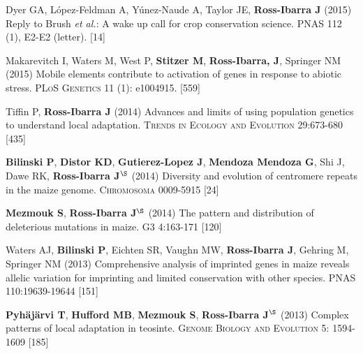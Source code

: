 \documentclass[letterpaper,10pt]{article}
\begin{document}
\begin{etaremune}
\item Dyer GA, L\'opez-Feldman A, Y\'unez-Naude A, Taylor JE, {\bf Ross-Ibarra J} (2015) Reply to Brush \emph{et al.}: A wake up call for crop conservation science. PNAS 112 (1), E2-E2 (letter).
{} [14]\\


\item Makarevitch I, Waters M, West P, {\bf Stitzer M}, {\bf Ross-Ibarra, J}, Springer NM (2015) Mobile elements contribute to activation of genes in response to abiotic stress. \textsc{PLoS Genetics} 11 (1): e1004915. %
{} [559]\\


\item Tiffin P, {\bf Ross-Ibarra J} (2014) Advances and limits of using population genetics to understand local adaptation. \textsc{Trends in Ecology and Evolution} 29:673-680 %
{} [435]\\


\item {\bf Bilinski P}, {\bf Distor KD}, {\bf Gutierez-Lopez J}, {\bf Mendoza Mendoza G}, Shi J, Dawe RK,  {\bf Ross-Ibarra J}$^\S$ (2014) Diversity and evolution of centromere repeats in the maize genome. \textsc{Chromosoma} 0009-5915
{} [24]\\

\item {\bf Mezmouk S}, {\bf Ross-Ibarra J}$^\S$ (2014) The pattern and distribution of deleterious mutations in maize. \textsc{G3} 4:163-171
{} [120]\\

\item Waters AJ, {\bf Bilinski P}, Eichten SR, Vaughn MW, {\bf Ross-Ibarra J}, Gehring M, Springer NM (2013) Comprehensive analysis of imprinted genes in maize reveals allelic variation for imprinting and limited conservation with other species. \textsc{PNAS} 110:19639-19644
{} [151]\\


\item {\bf Pyh\"aj\"arvi T}, {\bf Hufford MB}, {\bf Mezmouk S}, {\bf Ross-Ibarra J}$^\S$ (2013) Complex patterns of local adaptation in teosinte. \textsc{Genome Biology and Evolution} 5: 1594-1609 %
{} [185]\\



\end{etaremune}
\end{document}
